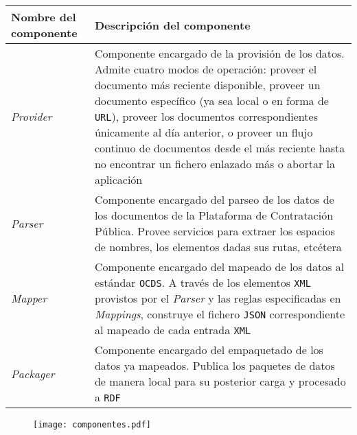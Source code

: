             \begin{center}
                \begin{tabular}{|| M{3cm} | M{12cm} ||} 
                    \hline
                        Nombre del componente & Descripción del componente \\
                    \hline\hline
                        \textit{\large Provider} & Componente encargado de la provisión de los datos. Admite cuatro modos de operación: proveer el documento más reciente disponible, proveer un documento específico (ya sea local o en forma de \texttt{URL}), proveer los documentos correspondientes únicamente al día anterior, o proveer un flujo continuo de documentos desde el más reciente hasta no encontrar un fichero enlazado más o abortar la aplicación \\ 
                    \hline
                        \textit{\large Parser} & Componente encargado del parseo de los datos de los documentos de la Plataforma de Contratación Pública. Provee servicios para extraer los espacios de nombres, los elementos dadas sus rutas, etcétera  \\
                    \hline
                        \textit{\large Mapper} & Componente encargado del mapeado de los datos al estándar \texttt{OCDS}. A través de los elementos \texttt{XML} provistos por el \textit{Parser} y las reglas especificadas en \textit{Mappings}, construye el fichero \texttt{JSON} correspondiente al mapeado de cada entrada \texttt{XML} \\
                    \hline
                        \textit{\large Packager} & Componente encargado del empaquetado de los datos ya mapeados. Publica los paquetes de datos de manera local para su posterior carga y procesado a \texttt{RDF} \\
                    \hline
                \end{tabular}
            \end{center}
            
            \vspace{0.3cm}
            
            \begin{figure}[h]
                \centering
                \texttt{[image: componentes.pdf]}
                \label{fig:componentes}
            \end{figure}
            
